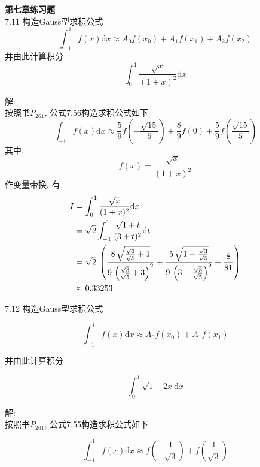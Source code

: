 \documentclass[a4paper, 10pt]{article}
\newcommand{\ud}[1]{\mathrm{d} {#1}}
\begin{document}
\begin{CJK}{UTF8}{gbsn}

\textbf{第七章练习题} \\

7.11
构造Gauss型求积公式
\begin{equation*}
	\int_{-1}^{1}f(x)\ud{x} \approx A_0 f(x_0) + A_1 f(x_1) + A_2 f(x_2)
\end{equation*}
并由此计算积分
\begin{equation*}
	\int_{0}^{1}\frac{\sqrt{x}}{(1+x)^2}\ud{x}
\end{equation*}

解: \\

按照书$P_{261}$, 公式7.56构造求积公式如下
\begin{equation*}
	\int_{-1}^{1}f(x)\ud{x} \approx \frac{5}{9}f(-\frac{\sqrt{15}}{5})+\frac{8}{9}f(0)+\frac{5}{9}f(\frac{\sqrt{15}}{5})
\end{equation*}
其中,
\begin{equation}
	f(x) = \frac{\sqrt{x}}{(1+x)^2}
\end{equation}
作变量带换, 有
\begin{align*}
	I & = \int_{0}^{1}\frac{\sqrt{x}}{(1+x)^2}\ud{x} \\
	  & = \sqrt{2}\int_{-1}^{1}\frac{\sqrt{1+t}}{(3+t)^2}\ud{t} \\
	  & = \sqrt{2}\,\left({{8\,\sqrt{{{\sqrt{3}}\over{\sqrt{5}}}+1}}\over{9\,\left({{\sqrt{3}}\over{\sqrt{5}}}+3\right)^2}}+{{5\,\sqrt{1-{{\sqrt{3}}\over{\sqrt{5}}}}}\over{9\,\left(3-{{\sqrt{3}}\over{\sqrt{5}}}\right)^2}}+{{8}\over{81}}\right) \\
	  & \approx 0.33253
\end{align*}


7.12
构造Gauss型求积公式

\begin{equation*}
	\int_{-1}^{1}f(x)\ud{x} \approx A_0 f(x_0) + A_1 f(x_1)
\end{equation*}

并由此计算积分

\begin{equation*}
	\int_{0}^{1}\sqrt{1+2x}\ud{x}
\end{equation*}

解: \\

按照书$P_{261}$, 公式7.55构造求积公式如下

\begin{equation*}
	\int_{-1}^{1}f(x)\ud{x} \approx f(-\frac{1}{\sqrt{3}})+f(\frac{1}{\sqrt{3}})
\end{equation*}



\end{CJK}
\end{document}
